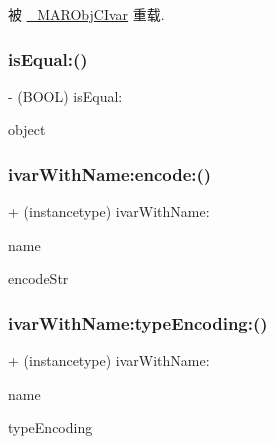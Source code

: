 被 \hyperlink{interface___m_a_r_obj_c_ivar_ac3cd7d9e7fe7a418d46bd4d9e216e351}{\+\_\+\+M\+A\+R\+Obj\+C\+Ivar} 重载.

\mbox{\label{interface_m_a_r_ivar_aeeb47e39d903cfcd7d7d053a9dba8a06}} 
\subsubsection{\texorpdfstring{is\+Equal\+:()}{isEqual:()}}
{\footnotesize\ttfamily -\/ (B\+O\+OL) is\+Equal\+: \begin{DoxyParamCaption}\item[{(id)}]{object }\end{DoxyParamCaption}\hspace{0.3cm}{\ttfamily [implementation]}}

\mbox{\label{interface_m_a_r_ivar_a4987108bf34de429f1569446dfe0fefe}} 
\subsubsection{\texorpdfstring{ivar\+With\+Name\+:encode\+:()}{ivarWithName:encode:()}}
{\footnotesize\ttfamily + (instancetype) ivar\+With\+Name\+: \begin{DoxyParamCaption}\item[{(N\+S\+String $\ast$)}]{name }\item[{encode:(const char $\ast$)}]{encode\+Str }\end{DoxyParamCaption}}

\mbox{\label{interface_m_a_r_ivar_af65aa7a88a5831ae47f5e86213f61893}} 
\subsubsection{\texorpdfstring{ivar\+With\+Name\+:type\+Encoding\+:()}{ivarWithName:typeEncoding:()}}
{\footnotesize\ttfamily + (instancetype) ivar\+With\+Name\+: \begin{DoxyParamCaption}\item[{(N\+S\+String $\ast$)}]{name }\item[{typeEncoding:(N\+S\+String $\ast$)}]{type\+Encoding }\end{DoxyParamCaption}}

